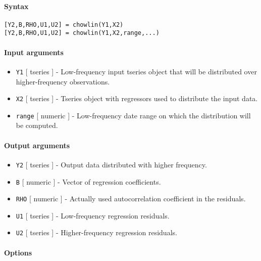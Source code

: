 


	\paragraph{Syntax}

\begin{verbatim}
[Y2,B,RHO,U1,U2] = chowlin(Y1,X2)
[Y2,B,RHO,U1,U2] = chowlin(Y1,X2,range,...)
\end{verbatim}

\paragraph{Input arguments}

\begin{itemize}
\item
  \texttt{Y1} {[} tseries {]} - Low-frequency input tseries object that
  will be distributed over higher-frequency observations.
\item
  \texttt{X2} {[} tseries {]} - Tseries object with regressors used to
  distribute the input data.
\item
  \texttt{range} {[} numeric {]} - Low-frequency date range on which the
  distribution will be computed.
\end{itemize}

\paragraph{Output arguments}

\begin{itemize}
\item
  \texttt{Y2} {[} tseries {]} - Output data distributed with higher
  frequency.
\item
  \texttt{B} {[} numeric {]} - Vector of regression coefficients.
\item
  \texttt{RHO} {[} numeric {]} - Actually used autocorrelation
  coefficient in the residuals.
\item
  \texttt{U1} {[} tseries {]} - Low-frequency regression residuals.
\item
  \texttt{U2} {[} tseries {]} - Higher-frequency regression residuals.
\end{itemize}

\paragraph{Options}

